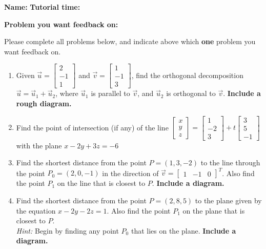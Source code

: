 \documentclass[12pt]{article}
\newcommand{\bbm}{\begin{bmatrix}}
\newcommand{\ebm}{\end{bmatrix}}
\begin{document}
{\bf \large Name:} \hspace{2.5in} {\bf Tutorial time:}

\bigskip

{\bf Problem you want feedback on:}

\bigskip

\thispagestyle{fancy}
Please complete all problems below, and indicate above which {\bf one} problem you want feedback on.
 \begin{enumerate}
 \item Given $\vec{u} = \bbm 2\\-1\\1\ebm$ and $\vec{v} = \bbm 1\\-1\\3\ebm$, find the orthogonal decomposition $\vec{u} = \vec{u}_1+\vec{u}_2$, where $\vec{u}_1$ is parallel to $\vec{v}$, and $\vec{u}_2$ is orthogonal to $\vec{v}$. {\bf Include a rough diagram.}

\vspace{3in}

 \item Find the point of intersection (if any) of the line $\bbm x\\y\\z\ebm = \bbm 1\\-2\\3\ebm+t\bbm 3\\5\\-1\ebm$ with the plane $x-2y+3z=-6$


\newpage

\item Find the shortest distance from the point $P=(1,3,-2)$ to the line through the point $P_0 = (2,0,-1)$ in the direction of $\vec{v} = \bbm 1&-1&0\ebm^T$. Also find the point $P_1$ on the line that is closest to $P$. {\bf Include a diagram.}

\vspace{4in}

\item Find the shortest distance from the point $P=(2,8,5)$ to the plane given by the equation $x-2y-2z=1$. Also find the point $P_1$ on the plane that is closest to $P$. \\
{\em Hint:} Begin by finding any point $P_0$ that lies on the plane. {\bf Include a diagram.}

 \end{enumerate}
\end{document}

